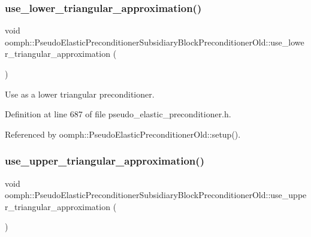 \subsubsection{\texorpdfstring{use\+\_\+lower\+\_\+triangular\+\_\+approximation()}{use\_lower\_triangular\_approximation()}}
{\footnotesize\ttfamily void oomph\+::\+Pseudo\+Elastic\+Preconditioner\+Subsidiary\+Block\+Preconditioner\+Old\+::use\+\_\+lower\+\_\+triangular\+\_\+approximation (\begin{DoxyParamCaption}{ }\end{DoxyParamCaption})\hspace{0.3cm}{\ttfamily [inline]}}



Use as a lower triangular preconditioner. 



Definition at line 687 of file pseudo\+\_\+elastic\+\_\+preconditioner.\+h.



Referenced by oomph\+::\+Pseudo\+Elastic\+Preconditioner\+Old\+::setup().

\mbox{\label{classoomph_1_1PseudoElasticPreconditionerSubsidiaryBlockPreconditionerOld_a3a6487cc895a4e3a3fe8f978024e116e}} 
\subsubsection{\texorpdfstring{use\+\_\+upper\+\_\+triangular\+\_\+approximation()}{use\_upper\_triangular\_approximation()}}
{\footnotesize\ttfamily void oomph\+::\+Pseudo\+Elastic\+Preconditioner\+Subsidiary\+Block\+Preconditioner\+Old\+::use\+\_\+upper\+\_\+triangular\+\_\+approximation (\begin{DoxyParamCaption}{ }\end{DoxyParamCaption})\hspace{0.3cm}{\ttfamily [inline]}}



